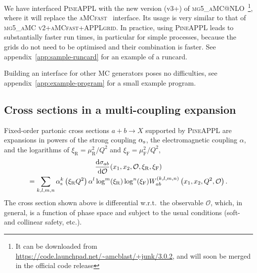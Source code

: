 We have interfaced \textsc{PineAPPL} with the new version (v3+) of
\textsc{mg5\_aMC@NLO}~\cite{Alwall:2014hca,Frederix:2018nkq}\footnote{It can be downloaded 
    from \url{https://code.launchpad.net/~amcblast/+junk/3.0.2}, and will soon be merged in the official code release}, where it will replace the \textsc{aMCfast}~\cite{Bertone:2014zva} interface.
Its usage is very similar to that of \textsc{mg5\_aMC v2}+\textsc{aMCfast}+\textsc{APPLgrid}.
In practice, using \textsc{PineAPPL} leads to substantially faster run times, in particular for simple processes, because the grids do not need to be optimised 
and their combination is faster.
See appendix~\ref{app:sample-runcard} for an example of a runcard.

Building an interface for other MC generators poses no difficulties, see appendix~\ref{app:example-program} for a small example program.

\subsection{Cross sections in a multi-coupling expansion}
\label{sec:multi-coupling-expansion}

Fixed-order partonic cross sections $a + b \to X$ supported by \textsc{PineAPPL} are expansions in powers of the strong coupling $\alpha_\mathrm{s}$, the electromagnetic coupling $\alpha$, and the logarithms of $\xi_\mathrm{R} = \mu_\mathrm{R}^2 / Q^2$ and $\xi_\mathrm{F} = \mu_\mathrm{F}^2 / Q^2$,
\begin{multline}
\frac{\mathrm{d} \sigma_{ab}}{\mathrm{d} \mathcal{O}} (x_1, x_2, \mathcal{O}, \xi_\mathrm{R}, \xi_\mathrm{F}) \\
= \sum_{k,l,m,n} \alpha_\mathrm{s}^k \left( \xi_\mathrm{R} Q^2 \right) \alpha^l \log^m ( \xi_\mathrm{R} ) \log^n ( \xi_\mathrm{F} ) W_{ab}^{(k,l,m,n)} \left( x_1, x_2, Q^2, \mathcal{O} \right) \text{.}
\label{eq:expansion}
\end{multline}
The cross section shown above is differential w.r.t.\ the observable $\mathcal{O}$, which, in general, is a function of phase space and subject to the usual conditions (soft- and collinear safety, etc.).


